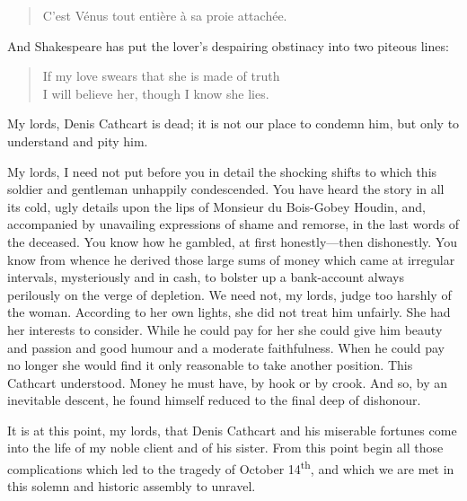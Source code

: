 \begin{dialogue}
\begin{quote}C'est Vénus tout entière à sa proie attachée.\end{quote}

\smallskip 

And Shakespeare has put the lover's despairing obstinacy into two piteous lines:

\begin{verse}
If my love swears that she is made of truth\\
I will believe her, though I know she lies.\\
\end{verse}

\smallskip 

My lords, Denis Cathcart is dead; it is not our place to condemn him, but only to understand and pity him.

\smallskip 

My lords, I need not put before you in detail the shocking shifts to which this soldier and gentleman unhappily condescended. You have heard the story in all its cold, ugly details upon the lips of Monsieur du Bois-Gobey Houdin, and, accompanied by unavailing expressions of shame and remorse, in the last words of the deceased. You know how he gambled, at first honestly—then dishonestly. You know from whence he derived those large sums of money which came at irregular intervals, mysteriously and in cash, to bolster up a bank-account always perilously on the verge of depletion. We need not, my lords, judge too harshly of the woman. According to her own lights, she did not treat him unfairly. She had her interests to consider. While he could pay for her she could give him beauty and passion and good humour and a moderate faithfulness. When he could pay no longer she would find it only reasonable to take another position. This Cathcart understood. Money he must have, by hook or by crook. And so, by an inevitable descent, he found himself reduced to the final deep of dishonour.

\smallskip 

It is at this point, my lords, that Denis Cathcart and his miserable fortunes come into the life of my noble client and of his sister. From this point begin all those complications which led to the tragedy of October 14\textsuperscript{th}, and which we are met in this solemn and historic assembly to unravel.

\smallskip 


\end{dialogue}
